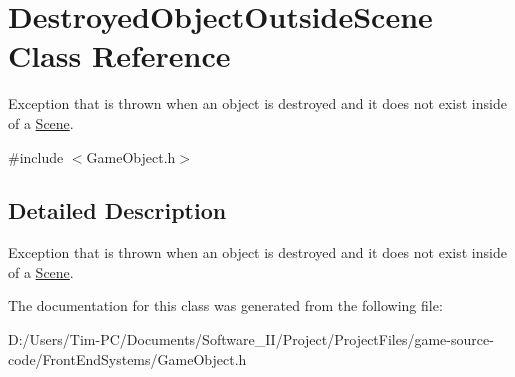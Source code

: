 \hypertarget{class_destroyed_object_outside_scene}{}\section{Destroyed\+Object\+Outside\+Scene Class Reference}
\label{class_destroyed_object_outside_scene}


Exception that is thrown when an object is destroyed and it does not exist inside of a \hyperlink{class_scene}{Scene}.  




{\ttfamily \#include $<$Game\+Object.\+h$>$}



\subsection{Detailed Description}
Exception that is thrown when an object is destroyed and it does not exist inside of a \hyperlink{class_scene}{Scene}. 

The documentation for this class was generated from the following file\+:\begin{DoxyCompactItemize}
\item 
D\+:/\+Users/\+Tim-\/\+P\+C/\+Documents/\+Software\+\_\+\+I\+I/\+Project/\+Project\+Files/game-\/source-\/code/\+Front\+End\+Systems/Game\+Object.\+h\end{DoxyCompactItemize}
